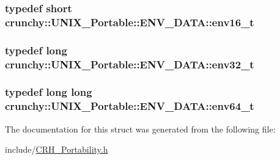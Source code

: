 \subsubsection[{env16\+\_\+t}]{\setlength{\rightskip}{0pt plus 5cm}typedef short {\bf crunchy\+::\+U\+N\+I\+X\+\_\+\+Portable\+::\+E\+N\+V\+\_\+\+D\+A\+T\+A\+::env16\+\_\+t}}\label{structcrunchy_1_1_u_n_i_x___portable_1_1_e_n_v___d_a_t_a_ad0f7a36599aa831e6f0186d0eab41e69}
\hypertarget{structcrunchy_1_1_u_n_i_x___portable_1_1_e_n_v___d_a_t_a_ad3928f01a5462ef0064f802ab3b2d8a9}{}
\subsubsection[{env32\+\_\+t}]{\setlength{\rightskip}{0pt plus 5cm}typedef long {\bf crunchy\+::\+U\+N\+I\+X\+\_\+\+Portable\+::\+E\+N\+V\+\_\+\+D\+A\+T\+A\+::env32\+\_\+t}}\label{structcrunchy_1_1_u_n_i_x___portable_1_1_e_n_v___d_a_t_a_ad3928f01a5462ef0064f802ab3b2d8a9}
\hypertarget{structcrunchy_1_1_u_n_i_x___portable_1_1_e_n_v___d_a_t_a_acf3a73691f8290fd4c537863eb566167}{}
\subsubsection[{env64\+\_\+t}]{\setlength{\rightskip}{0pt plus 5cm}typedef long long {\bf crunchy\+::\+U\+N\+I\+X\+\_\+\+Portable\+::\+E\+N\+V\+\_\+\+D\+A\+T\+A\+::env64\+\_\+t}}\label{structcrunchy_1_1_u_n_i_x___portable_1_1_e_n_v___d_a_t_a_acf3a73691f8290fd4c537863eb566167}


The documentation for this struct was generated from the following file\+:\begin{DoxyCompactItemize}
\item 
include/\hyperlink{_c_r_h___portability_8h}{C\+R\+H\+\_\+\+Portability.\+h}\end{DoxyCompactItemize}
